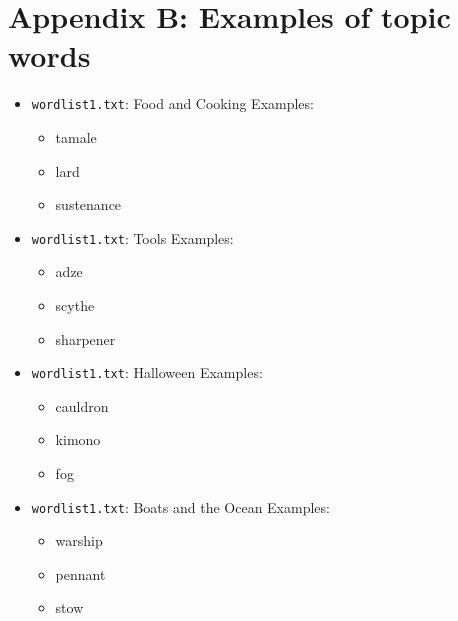 \documentclass{article}
\begin{document}
\section{Appendix B: Examples of topic words}
\begin{itemize}
\item \texttt{wordlist1.txt}: Food and Cooking
  Examples:
  \begin{itemize}
  \item tamale
  \item lard
  \item sustenance
  \end{itemize}
\item \texttt{wordlist1.txt}: Tools
  Examples:
  \begin{itemize}
  \item adze
  \item scythe
  \item sharpener
  \end{itemize}
\item \texttt{wordlist1.txt}: Halloween
  Examples:
  \begin{itemize}
  \item cauldron
  \item kimono
  \item fog
  \end{itemize}
\item \texttt{wordlist1.txt}: Boats and the Ocean
  Examples:
  \begin{itemize}
  \item warship
  \item pennant
  \item stow
  \end{itemize}
\end{itemize}
\end{document}
